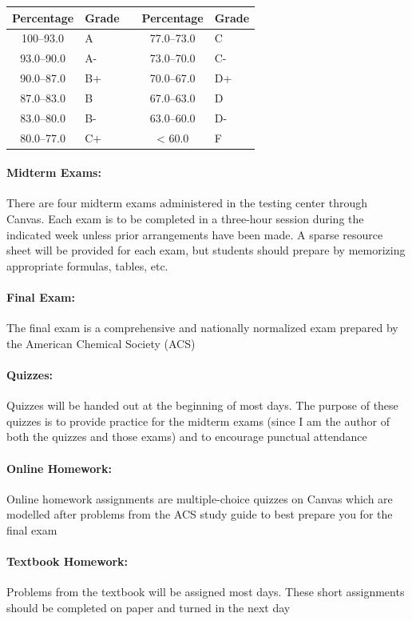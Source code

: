\documentclass[12pt, letterpaper]{article}
\begin{document}
\begin{tabular}{cl|c|cl}
	Percentage & Grade &  & Percentage & Grade \\ \midrule
	100--93.0  & A     &  & 77.0--73.0 & C     \\
	93.0--90.0 & A-    &  & 73.0--70.0 & C-    \\
	90.0--87.0 & B+    &  & 70.0--67.0 & D+    \\
	87.0--83.0 & B     &  & 67.0--63.0 & D     \\
	83.0--80.0 & B-    &  & 63.0--60.0 & D-    \\
	80.0--77.0 & C+    &  & < 60.0     & F
\end{tabular}

\paragraph{Midterm Exams:}
There are four midterm exams administered in the testing center through Canvas. Each exam is to be completed in a three-hour session during the indicated week unless prior arrangements have been made. A sparse resource sheet will be provided for each exam, but students should prepare by memorizing appropriate formulas, tables, etc.

\paragraph{Final Exam:}
The final exam is a comprehensive and nationally normalized exam prepared by the American Chemical Society (ACS)

\paragraph{Quizzes:}
Quizzes will be handed out at the beginning of most days. The purpose of these quizzes is to provide practice for the midterm exams (since I am the author of both the quizzes and those exams) and to encourage punctual attendance

\paragraph{Online Homework:}
Online homework assignments are multiple-choice quizzes on Canvas which are modelled after problems from the ACS study guide to best prepare you for the final exam

\paragraph{Textbook Homework:}
Problems from the textbook will be assigned most days. These short assignments should be completed on paper and turned in the next day
\end{document}
